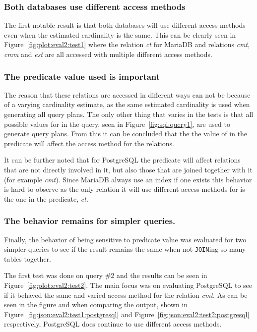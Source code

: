 \subsubsection{Both databases use different access methods}
The first notable result is that both databases will use different access
methods even when the estimated cardinality is the same. This can be clearly
seen in Figure~\ref{fig:plot:eval2:test1} where the relation \textit{ct} for
MariaDB and relations \textit{cmt}, \textit{cmm} and \textit{est} are all
accessed with multiple different access methods.

\subsubsection{The predicate value used is important}
The reason that these relations are accessed in different ways can not be
because of a varying cardinality estimate, as the same estimated cardinality is
used when generating all query plans. The only other thing that varies in the
tests is that all possible values for  in the query, seen in
Figure~\ref{fig:sql:query1}, are used to generate query plans. From this it can
be concluded that the the value of  in the predicate  will affect the access method for the relations.

It can be further noted that for PostgreSQL the predicate will affect relations
that are not directly involved in it, but also those that are joined together
with it (for example \textit{cmt}). Since MariaDB always use an index if one
exists this behavior is hard to observe as the only relation it will use
different access methods for is the one in the predicate, \textit{ct}.

\subsubsection{The behavior remains for simpler queries.}
Finally, the behavior of being sensitive to predicate value was evaluated for
two simpler queries to see if the result remains the same when not
\texttt{JOIN}ing so many tables together.

The first test was done on query \#2 and the results can be seen in
Figure~\ref{fig:plot:eval2:test2}. The main focus was on evaluating PostgreSQL
to see if it behaved the same and varied access method for the relation
\textit{cmt}. As can be seen in the figure and when comparing the output, shown
in Figure~\ref{fig:json:eval2:test1:postgresql} and
Figure~\ref{fig:json:eval2:test2:postgresql} respectively, PostgreSQL does
continue to use different access methods.


